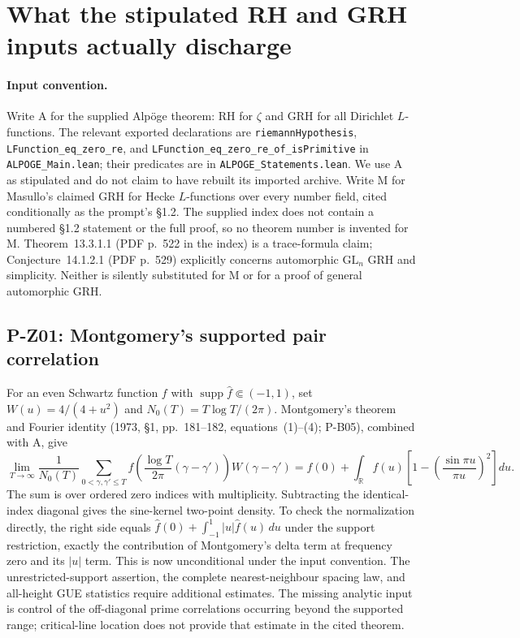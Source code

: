 \documentclass[11pt,a4paper]{article}
\theoremstyle{definition}\newtheorem{definition}{Definition}
\begin{document}

\section{What the stipulated RH and GRH inputs actually discharge}

\paragraph{Input convention.}
Write A for the supplied Alp\"oge theorem: RH for $\zeta$ and GRH for all Dirichlet $L$-functions. The relevant exported declarations are \nolinkurl{riemannHypothesis}, \nolinkurl{LFunction_eq_zero_re}, and \nolinkurl{LFunction_eq_zero_re_of_isPrimitive} in \nolinkurl{ALPOGE_Main.lean}; their predicates are in \nolinkurl{ALPOGE_Statements.lean}. We use A as stipulated and do not claim to have rebuilt its imported archive. Write M for Masullo's claimed GRH for Hecke $L$-functions over every number field, cited conditionally as the prompt's \S1.2. The supplied index does not contain a numbered \S1.2 statement or the full proof, so no theorem number is invented for M. Theorem~13.3.1.1 (PDF p.~522 in the index) is a trace-formula claim; Conjecture~14.1.2.1 (PDF p.~529) explicitly concerns automorphic $\mathrm{GL}_n$ GRH and simplicity. Neither is silently substituted for M or for a proof of general automorphic GRH.

\subsection{P-Z01: Montgomery's supported pair correlation}
For an even Schwartz function $f$ with $\operatorname{supp}\widehat f\Subset(-1,1)$, set $W(u)=4/(4+u^2)$ and $N_0(T)=T\log T/(2\pi)$. Montgomery's theorem and Fourier identity (1973, \S1, pp.~181--182, equations~(1)--(4); P-B05), combined with A, give
\[
 \lim_{T\to\infty}\frac1{N_0(T)}
 \sum_{0<\gamma,\gamma'\le T}
 f\left(\frac{\log T}{2\pi}(\gamma-\gamma')\right)W(\gamma-\gamma')
 = f(0)+\int_{\mathbb R}f(u)\left[1-\left(\frac{\sin\pi u}{\pi u}\right)^2\right]du.
\]
The sum is over ordered zero indices with multiplicity. Subtracting the identical-index diagonal gives the sine-kernel two-point density. To check the normalization directly, the right side equals
$\widehat f(0)+\int_{-1}^1|u|\widehat f(u)\,du$ under the support restriction, exactly the contribution of Montgomery's delta term at frequency zero and its $|u|$ term. This is now unconditional under the input convention. The unrestricted-support assertion, the complete nearest-neighbour spacing law, and all-height GUE statistics require additional estimates. The missing analytic input is control of the off-diagonal prime correlations occurring beyond the supported range; critical-line location does not provide that estimate in the cited theorem.
\end{document}
